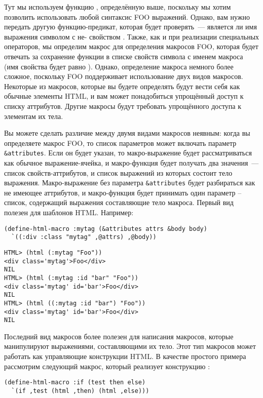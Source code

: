 Тут мы используем функцию , определённую выше, поскольку мы хотим
позволить использовать любой синтаксис FOO выражений.  Однако, вам нужно передать другую
функцию-предикат, которая будет проверять~--- является ли имя выражения символом с
не- свойством .  Также, как и при реализации специальных
операторов, мы определим макрос для определения макросов FOO, которая будет отвечать за
сохранение функции в списке свойств символа с именем макроса (имя свойства будет равно
).  Однако, определение макроса немного более сложное, поскольку FOO
поддерживает использование двух видов макросов. Некоторые из макросов, которые вы будете
определять будут вести себя как обычные элементы HTML, и вам может понадобиться упрощённый
доступ к списку аттрибутов.  Другие макросы будут требовать упрощённого доступа к
элементам их тела.

Вы можете сделать различие между двумя видами макросов неявным: когда вы определяете
макрос FOO, то список параметров может включать параметр \lstinline!&attributes!.  Если он
будет указан, то макро-выражение будет рассматриваться как обычное выражение-ячейка, и
макро-функция будет получать два значения~--- список свойств-аттрибутов, и список выражений
из которых состоит тело выражения.  Макро-выражение без параметра \lstinline!&attributes!
будет разбираться как не имеющее аттрибутов, и макро-функция будет принимать один параметр
-- список, содержащий выражения составляющие тело макроса.  Первый вид полезен для
шаблонов HTML. Например:

\begin{lstlisting}
(define-html-macro :mytag (&attributes attrs &body body)
  `((:div :class "mytag" ,@attrs) ,@body))
\end{lstlisting}

\begin{verbatim}
HTML> (html (:mytag "Foo"))
<div class='mytag'>Foo</div>
NIL
HTML> (html (:mytag :id "bar" "Foo"))
<div class='mytag' id='bar'>Foo</div>
NIL
HTML> (html ((:mytag :id "bar") "Foo"))
<div class='mytag' id='bar'>Foo</div>
NIL
\end{verbatim}

Последний вид макросов более полезен для написания макросов, которые манипулируют
выражениями, составляющими их тело.  Этот тип макросов может работать как управляющие
конструкции HTML. В качестве простого примера рассмотрим следующий макрос, который
реализует конструкцию :

\begin{lstlisting}
(define-html-macro :if (test then else)
  `(if ,test (html ,then) (html ,else)))
\end{lstlisting}

